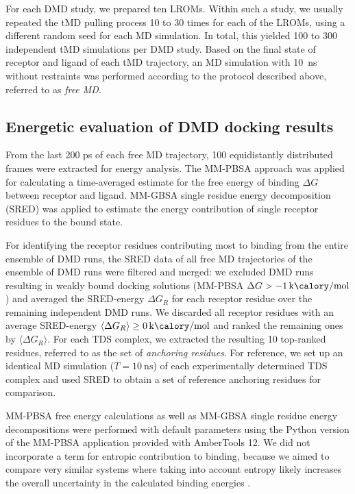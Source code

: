 For each DMD study, we prepared ten LROMs. Within such a study, we usually
repeated the tMD pulling process 10 to 30 times for each of the LROMs, using a
different random seed for each MD simulation. In total, this yielded 100 to 300
independent tMD simulations per DMD study. Based on the final state of receptor
and ligand of each tMD trajectory, an MD simulation with \SI{10}{\nano\second}
without restraints was performed according to the protocol described above,
referred to as \textit{free MD}.


\subsection{Energetic evaluation of DMD docking results}


From the last 200 ps of each free MD trajectory, 100 equidistantly distributed
frames were extracted for energy analysis. The MM-PBSA \cite{mmpbsa_py} approach
was applied for calculating a time-averaged estimate for the free energy of
binding $\Delta G$ between receptor and ligand. MM-GBSA \cite{mmpbsa_py} single
residue energy decomposition (SRED) was applied to estimate the energy
contribution of single receptor residues to the bound state.

For identifying the receptor residues contributing most to binding from the
entire ensemble of DMD runs, the SRED data of all free MD trajectories of the
ensemble of DMD runs were filtered and merged: we excluded DMD runs resulting in
weakly bound docking solutions (MM-PBSA $\Delta G >
\SI{-1}{\kilo\calory\per\mole} $) and averaged the SRED-energy $\Delta G_R$ for
each receptor residue over the remaining independent DMD runs. We discarded all
receptor residues with an average SRED-energy $\langle\Delta G_R\rangle \ge
\SI{0}{\kilo\calory\per\mole}$ and ranked the remaining ones by $\langle\Delta
G_R\rangle$. For each TDS complex, we extracted the resulting 10 top-ranked
residues, referred to as the set of \textit{anchoring residues}. For reference,
we set up an identical MD simulation ($T=\SI{10}{\nano\second}$) of each
experimentally determined TDS complex and used SRED to obtain a set of reference
anchoring residues for comparison.

MM-PBSA free energy calculations as well as MM-GBSA single residue energy
decompositions were performed with default parameters using the Python version
of the MM-PBSA application provided with AmberTools 12. We did not incorporate a
term for entropic contribution to binding, because we aimed to compare very
similar systems where taking into account entropy likely increases the overall
uncertainty in the calculated binding energies {\cite{Gandhi01102009,
homeyer_gohlke_2012}}.


